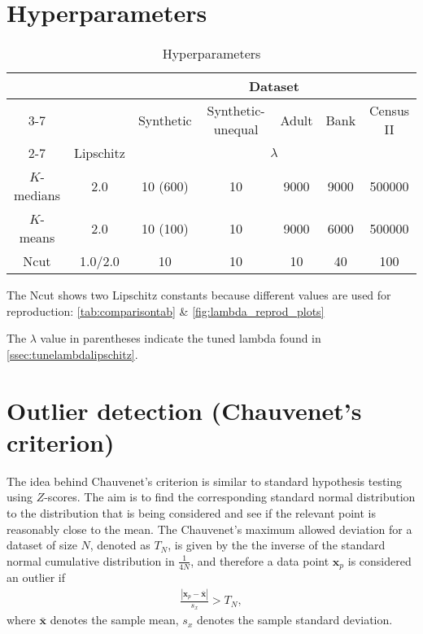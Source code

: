 \section{Hyperparameters}\label{appendix:hyperparams}
\begin{table}[H]
    \small
    \centering
    \begin{tabular}{|c|c|ccccc|}    \hline
    \multirow{4}{*}{}   & \multirow{2}{*}{} & \multicolumn{5}{c|}{Dataset} \\ \cline{3-7}
                        &                   & Synthetic & Synthetic-unequal & Adult & Bank  & Census II \\ \cline{2-7}
                        & Lipschitz         & \multicolumn{5}{c|}{$\lambda$}\\ \hline
    $K$-medians         & 2.0               & 10 (600) & 10 & 9000 & 9000 & 500000 \\\hline
    $K$-means           & 2.0               & 10 (100) & 10 & 9000 & 6000 & 500000 \\    \hline
    Ncut                & 1.0/2.0           & 10 & 10 & 10 & 40 & 100 \\    \hline
    \end{tabular}
    
    \begin{tablenotes}
      \small
      \item The Ncut shows two Lipschitz constants because different values are used for reproduction: \autoref{tab:comparisontab} \& \autoref{fig:lambda_reprod_plots}
      \item The $\lambda$ value in parentheses indicate the tuned lambda found in \autoref{ssec:tunelambdalipschitz}. 
    \end{tablenotes}
    \caption{Hyperparameters}
    \label{tab:hyperparamreprod}
\end{table}

\section{Outlier detection (Chauvenet's criterion)}
\label{sec:outlierdet}

The idea behind Chauvenet's criterion is similar to standard hypothesis testing using $Z$-scores. The aim is to find the corresponding standard normal distribution to the distribution that is being considered and see if the relevant point is reasonably close to the mean. The Chauvenet's maximum allowed deviation for a dataset of size $N$, denoted as $T_N$, is given by the the inverse of the standard normal cumulative distribution in $\frac{1}{4N}$, and therefore a data point $\textbf{x}_p$ is considered an outlier if
\begin{align*}
  \frac{|\textbf{x}_p - \bar{\textbf{x}}|}{s_x} > T_N,  
\end{align*}
where $\bar{\textbf{x}}$ denotes the sample mean, $s_x$ denotes the sample standard deviation.

